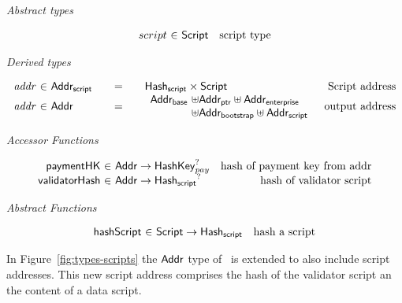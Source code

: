 \documentclass[11pt,a4paper,dvipsnames]{article}
\newcommand{\Addr}{\type{Addr}}
\newcommand{\AddrB}{\type{Addr_{base}}}
\newcommand{\AddrP}{\type{Addr_{ptr}}}
\newcommand{\AddrE}{\type{Addr_{enterprise}}}
\newcommand{\AddrBS}{\type{Addr_{bootstrap}}}
\newcommand{\AddrScr}{\type{Addr_{script}}}
\newcommand{\HashScr}{\type{Hash_{script}}}
\newcommand{\Script}{\type{Script}}
\newcommand{\HashKey}{\type{HashKey}}
\theoremstyle{definition}
\begin{document}
\begin{figure*}[hbt]
  \emph{Abstract types}

  \begin{equation*}
    \begin{array}{r@{~\in~}lr}
      script & \Script & \text{script type}
    \end{array}
  \end{equation*}

  \emph{Derived types}

  \begin{equation*}
    \begin{array}{r@{~\in~}l@{\qquad=\qquad}lr}
      \var{addr} & \AddrScr & \HashScr \times \Script & \text{Script address} \\
      \var{addr} & \Addr & \begin{array}{l@{~\uniondistinct}l}
                             \AddrB & \AddrP \uniondistinct \AddrE \\
                                    & \AddrBS \uniondistinct \AddrScr
                           \end{array}
                            & \text{output address}
    \end{array}
  \end{equation*}

  \emph{Accessor Functions}

  \begin{equation*}
    \begin{array}{r@{~\in~}lr}
      \fun{paymentHK} & \Addr \to \HashKey_{pay}^{?}
      & \text{hash of payment key from addr}\\
      \fun{validatorHash} & \Addr \to \HashScr^{?} & \text{hash of validator script}
    \end{array}
  \end{equation*}

  \emph{Abstract Functions}

  \begin{equation*}
    \begin{array}{{r@{~\in~}lr}}
      \fun{hashScript} & \Script \to \HashScr & \text{hash a script}
    \end{array}
  \end{equation*}

  \caption{Types for Scripts and Script Addresses}
  \label{fig:types-scripts}
\end{figure*}

In Figure~\ref{fig:types-scripts} the $\Addr$ type of~\cite{shelley_formal_spec}
is extended to also include script addresses. This new script address comprises
the hash of the validator script an the content of a data script.
\end{document}
